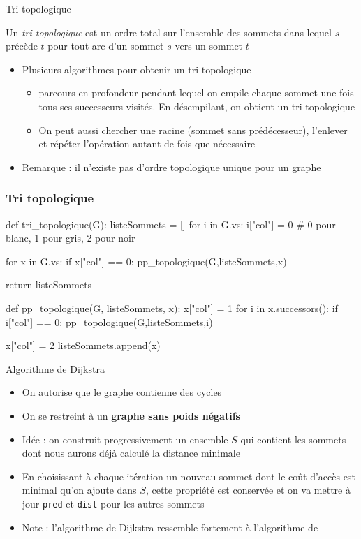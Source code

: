 \begin{frame}{Tri topologique}
    \begin{definition}
        Un \emph{tri topologique} est un ordre total sur l'ensemble des sommets dans lequel $s$ précède $t$ pour tout arc d'un sommet $s$ vers un sommet $t$
    \end{definition}
    \begin{itemize}
        \item Plusieurs algorithmes pour obtenir un tri topologique
        \begin{itemize}
            \item parcours en profondeur pendant lequel on empile chaque sommet une fois tous ses successeurs visités. En désempilant, on obtient un tri topologique
            \item On peut aussi chercher une racine (sommet sans prédécesseur), l'enlever et répéter l'opération autant de fois que nécessaire
        \end{itemize}
        \item Remarque : il n'existe pas d'ordre topologique unique pour un graphe 
    \end{itemize}
\end{frame}

\begin{frame}[fragile]
\frametitle{Tri topologique}
\begin{pythoncode}
def tri_topologique(G):
    listeSommets = []
    for i in G.vs:
        i["col"] = 0 # 0 pour blanc, 1 pour gris, 2 pour noir 
    
    for x in G.vs:
        if x["col"] == 0:
            pp_topologique(G,listeSommets,x)

    return listeSommets

def pp_topologique(G, listeSommets, x):
    x["col"] = 1
    for i in x.successors():
        if i["col"] == 0:
            pp_topologique(G,listeSommets,i)
    
    x["col"] = 2
    listeSommets.append(x)
\end{pythoncode}
\end{frame}



\begin{frame}{Algorithme de Dijkstra}
    \begin{itemize}
        \item On autorise que le graphe contienne des cycles
        \item On se restreint à un \textbf{graphe sans poids négatifs}
        \item Idée : on construit progressivement un ensemble $S$ qui contient les sommets dont nous aurons déjà calculé la distance minimale 
        \item En choisissant à chaque itération un nouveau sommet dont le coût d'accès est minimal qu'on ajoute dans $S$, cette propriété est conservée et on va mettre à jour \texttt{pred} et \texttt{dist} pour les autres sommets
        \item Note : l'algorithme de Dijkstra ressemble fortement à l'algorithme de \prim
    \end{itemize}
\end{frame}


